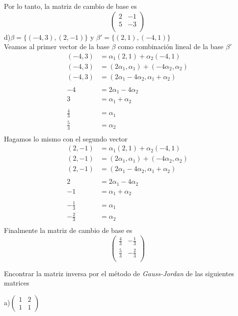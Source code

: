 \documentclass[letterpaper]{article}
\renewcommand{\*}{\cdot}
\theoremstyle{definition}
\begin{document}
	Por lo tanto, la matriz de cambio de base es
	\[ \begin{pmatrix}
	2 & -1\\
	5 & -3\\
	\end{pmatrix} \]
	d)$\beta = \lbrace (-4,3),(2,-1) \rbrace$ y $\beta' = \lbrace (2,1),(-4,1) \rbrace$\\
	Veamos al primer vector de la base $ \beta $ como combinación lineal de la base $ \beta' $
	\begin{align*}
		(-4,3) & = \alpha_1(2,1) + \alpha_2(-4,1)\\
		(-4,3) & = (2\alpha_1,\alpha_1) + (-4\alpha_2,\alpha_2)\\
		(-4,3) & = (2\alpha_1-4\alpha_2,\alpha_1+\alpha_2)\\
		\\
		-4 & = 2\alpha_1-4\alpha_2\\
		3& =\alpha_1+\alpha_2\\
		\\
		\frac{4}{3}& =\alpha_1\\
		\frac{5}{3}& =\alpha_2\\
	\end{align*}
	Hagamos lo mismo con el segundo vector
	\begin{align*}
	(2,-1) & = \alpha_1(2,1) + \alpha_2(-4,1)\\
	(2,-1) & = (2\alpha_1,\alpha_1) + (-4\alpha_2,\alpha_2)\\
	(2,-1) & = (2\alpha_1-4\alpha_2,\alpha_1+\alpha_2)\\
	\\
	2 & = 2\alpha_1-4\alpha_2\\
	-1 & =\alpha_1+\alpha_2\\
	\\
	-\frac{1}{3}& =\alpha_1\\
	-\frac{2}{3}& =\alpha_2\\
	\end{align*}
	Finalmente la matriz de cambio de base es 
	\[ \begin{pmatrix}
	\frac{4}{3} & -\frac{1}{3}\\
	\frac{5}{3} & -\frac{2}{3}\\
	\end{pmatrix} \]
	\begin{ejercicio}{13}
		Encontrar la matriz inversa por el método de \textit{Gauss-Jordan} de las siguientes matrices 
	\end{ejercicio}
	\noindent a)$\begin{pmatrix} 1 & 2 \\ 1 & 1 \end{pmatrix}$\\
\end{document}
